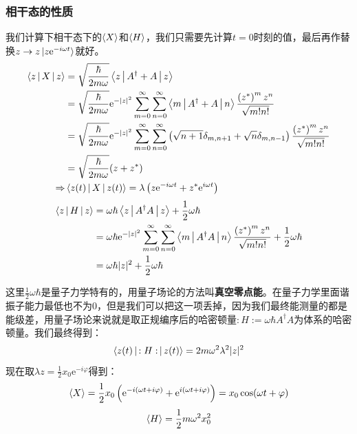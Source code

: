 \documentclass[a4paper,zihao=-4,linespread=1]{ctexrep}
\begin{document}
    \subsubsection{相干态的性质}
    我们计算下相干态下的$\Braket{X}$和$\Braket{H}$，我们只需要先计算$t=0$时刻的值，最后再作替换$z\to z\ket{z\mathrm{e}^{-i\omega t}}$就好。
    \begin{equation}
    	\begin{aligned}
    		\Braket{z|X|z}&=\sqrt{\frac{\hbar}{2m\omega}}\Braket{z|A^\dagger+A|z}\\
    		&=\sqrt{\frac{\hbar}{2m\omega}}\mathrm{e}^{-|z|^2}\sum_{m=0}^\infty\sum_{n=0}^\infty\Braket{m|A^\dagger+A|n}\frac{\left(z^*\right)^mz^n}{\sqrt{m!n!}}\\
    		&=\sqrt{\frac{\hbar}{2m\omega}}\mathrm{e}^{-|z|^2}\sum_{m=0}^\infty\sum_{n=0}^\infty\left(\sqrt{n+1}\delta_{m,n+1}+\sqrt{n}\delta_{m,n-1}\right)\frac{\left(z^*\right)^mz^n}{\sqrt{m!n!}}\\
    		&=\sqrt{\frac{\hbar}{2m\omega}}(z+z^*)\\
    		\Rightarrow&\Braket{z(t)|X|z(t)}=\lambda\left(z\mathrm{e}^{-i\omega t}+z^*\mathrm{e}^{i\omega t}\right)
    	\end{aligned}
    \end{equation}
    \begin{equation}
    	\begin{aligned}
    		\Braket{z|H|z}&=\omega \hbar\Braket{z|A^\dagger A|z}+\frac{1}{2}\omega\hbar\\
    		&=\omega \hbar \mathrm{e}^{-|z|^2}\sum_{m=0}^\infty\sum_{n=0}^\infty\Braket{m|A^\dagger A|n}\frac{\left(z^*\right)^mz^n}{\sqrt{m!n!}}+\frac{1}{2}\omega\hbar\\
    		&= \omega\hbar |z|^2+\frac{1}{2}\omega\hbar
    	\end{aligned}
    \end{equation}
    
    这里$\frac{1}{2}\omega\hbar$是量子力学特有的，用量子场论的方法叫\textbf{真空零点能}。在量子力学里面谐振子能力最低也不为0，但是我们可以把这一项丢掉，因为我们最终能测量的都是能级差，用量子场论来说就是取正规编序后的哈密顿量$:H:=\omega\hbar A^\dagger A$为体系的哈密顿量。我们最终得到：
    \begin{equation}
    	\Braket{z(t)|:H:|z(t)}=2m\omega^2\lambda^2|z|^2
    \end{equation}
    现在取$\lambda z=\frac{1}{2}x_0\mathrm{e}^{-i\varphi}$得到：
    \begin{equation}
    	\braket{X}=\frac{1}{2}x_0\left(\mathrm{e}^{-i(\omega t+i\varphi )}+\mathrm{e}^{i(\omega t+i\varphi )}\right)=x_0\cos(\omega t+\varphi)
    \end{equation}
    \begin{equation}
    	\braket{H}=\frac{1}{2}m\omega^2 x_0^2
    \end{equation}
    
\end{document}
